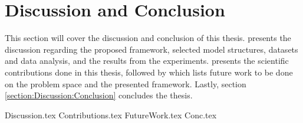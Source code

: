 \chapter{Discussion and Conclusion}

\label{section:Discussion}

This section will cover the discussion and conclusion of this thesis.
 presents the discussion regarding the proposed framework,
selected model structures, datasets and data analysis, and the results from the experiments.
 presents the scientific contributions done in this thesis,
followed by  which lists future work to be done on the problem space and the presented framework.
Lastly, section \ref{section:Discussion:Conclusion} concludes the thesis.


{Discussion.tex}
{Contributions.tex}
{FutureWork.tex}
{Conc.tex}
